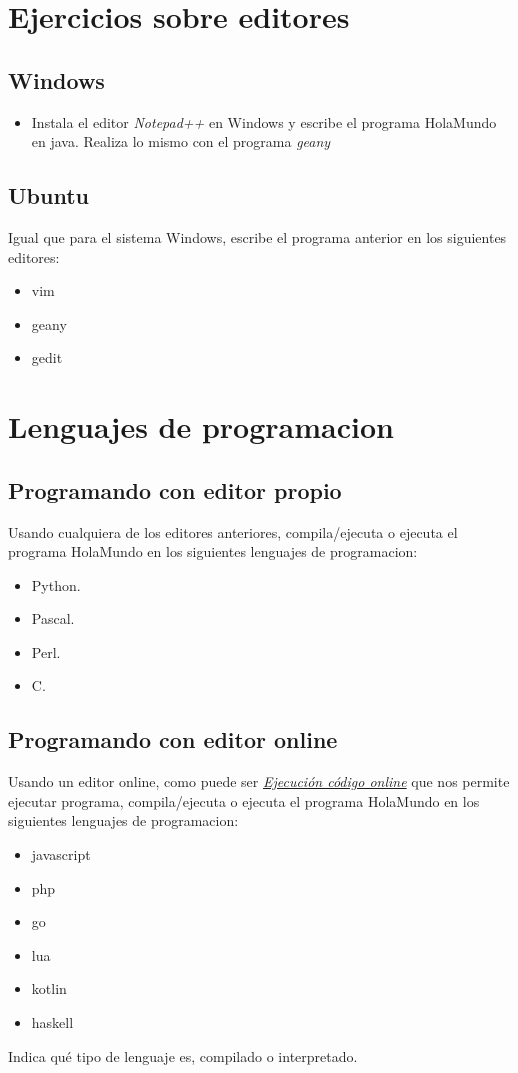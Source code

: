 \documentclass[a4paper,spanish]{article}
\begin{document}
\section{Ejercicios sobre editores}
\subsection{Windows}
\begin{itemize}
\item Instala el editor \emph{Notepad++} en Windows y escribe el programa HolaMundo en java. Realiza lo mismo con el programa \emph{geany}
\end{itemize}
\subsection{Ubuntu}
Igual que para el sistema Windows, escribe el programa anterior en los siguientes editores:
\begin{itemize}
\item vim
\item geany
\item gedit
\end{itemize}

\newpage

\section{Lenguajes de programacion}
\subsection{Programando con editor propio}
Usando cualquiera de los editores anteriores, compila/ejecuta  o ejecuta el programa HolaMundo en los siguientes lenguajes de programacion:
\begin{itemize}
\item Python.
\item Pascal.
\item Perl.
\item C.
\end{itemize}

\subsection{Programando con editor online}
Usando un editor online, como puede ser \emph{\href{http://ideone.com/}{Ejecución código online}} que nos permite ejecutar programa, compila/ejecuta  o ejecuta el programa HolaMundo en los siguientes lenguajes de programacion:
\begin{itemize}
\item javascript
\item php
\item go
\item lua
\item kotlin
\item haskell
\end{itemize}
Indica qué tipo de lenguaje es, compilado o interpretado.
\end{document}
